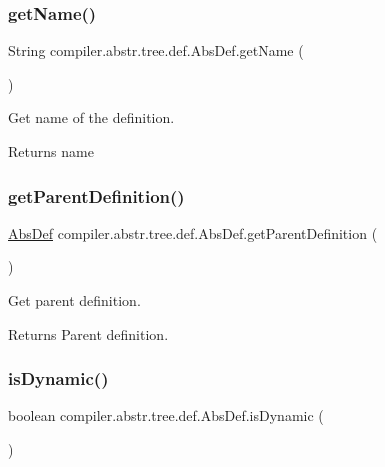 \subsubsection{\texorpdfstring{get\+Name()}{getName()}}
{\footnotesize\ttfamily String compiler.\+abstr.\+tree.\+def.\+Abs\+Def.\+get\+Name (\begin{DoxyParamCaption}{ }\end{DoxyParamCaption})}

Get name of the definition. \begin{DoxyReturn}{Returns}
name 
\end{DoxyReturn}
\mbox{\label{classcompiler_1_1abstr_1_1tree_1_1def_1_1_abs_def_a733146da3b86222096ad0e79362ebbb3}} 
\subsubsection{\texorpdfstring{get\+Parent\+Definition()}{getParentDefinition()}}
{\footnotesize\ttfamily \hyperlink{classcompiler_1_1abstr_1_1tree_1_1def_1_1_abs_def}{Abs\+Def} compiler.\+abstr.\+tree.\+def.\+Abs\+Def.\+get\+Parent\+Definition (\begin{DoxyParamCaption}{ }\end{DoxyParamCaption})}

Get parent definition. \begin{DoxyReturn}{Returns}
Parent definition. 
\end{DoxyReturn}
\mbox{\label{classcompiler_1_1abstr_1_1tree_1_1def_1_1_abs_def_ac681f6828c0fb2ee460fc6c89323fe75}} 
\subsubsection{\texorpdfstring{is\+Dynamic()}{isDynamic()}}
{\footnotesize\ttfamily boolean compiler.\+abstr.\+tree.\+def.\+Abs\+Def.\+is\+Dynamic (\begin{DoxyParamCaption}{ }\end{DoxyParamCaption})}

